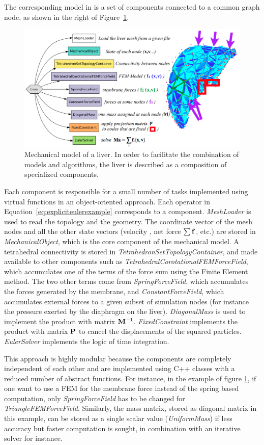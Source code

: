 The corresponding model in \sofa{} is a set of components connected to a common graph node, as shown in the right of Figure~\ref{fig:liver-mechanical}. 
%
\begin{figure}
 \centering
 \includegraphics[width=0.95\linewidth]{liver-mechanical2.png}   %
 \caption{Mechanical model of a liver. In order to facilitate the combination of models and algorithms, the liver is described as a composition of specialized components.}
 \label{fig:liver-mechanical}
\end{figure}
%
Each component is responsible for a small number of tasks implemented using virtual functions in an object-oriented approach.
Each operator in Equation~\ref{eq:expliciteulerexample} corresponds to a component.
\textit{MeshLoader} is used to read the topology and the geometry.
The coordinate vector \Vx of the mesh nodes and all the other state vectors (velocity \Vv, net force $\sum \Vf$, etc.) are stored in \textit{MechanicalObject}, which is the core component of the mechanical model.
A tetrahedral connectivity is stored in \textit{TetrahedronSetTopologyContainer}, and made available to other components such as \textit{TetrahedralCorotationalFEMForceField}, which accumulates one of the terms of the force sum using the Finite Element method.
The two other terms come from \textit{SpringForceField}, which accumulates the forces generated by the membrane, and  \textit{ConstantForceField}, which accumulates external forces to a given subset of simulation nodes (for instance the pressure exerted by the diaphragm on the liver).
\textit{DiagonalMass} is used to implement the product with matrix $\M^{-1}$.
\textit{FixedConstraint} implements the product with matrix $\P$ to cancel the displacements of the squared particles.
\textit{EulerSolver} implements the logic of time integration.

This approach is highly modular because the components are completely independent of each other and are implemented using C++ classes with a reduced number of abstract functions. 
For instance, in the example of figure \ref{fig:liver-mechanical}, if one want to use a FEM for the membrane force instead of the spring based computation, only \textit{SpringForceField} has to be changed for \textit{TriangleFEMForceField}. Similarly, the mass matrix, stored as diagonal matrix in this example, can be stored as a single scalar value (\textit{UniformMass}) if less accuracy but faster computation is sought, in combination with an iterative solver for instance.



